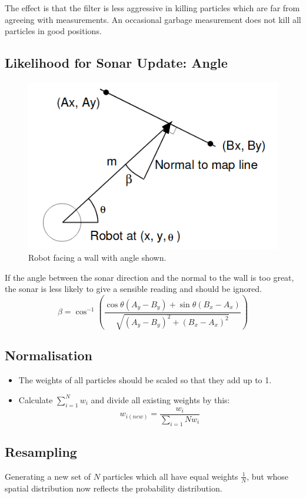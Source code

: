 \documentclass[11pt]{article}
\begin{document}
The effect is that the filter is less aggressive in killing particles which are far from agreeing with measurements.
An occasional garbage measurement does not kill all particles in good positions.

\subsection{Likelihood for Sonar Update: Angle}
\begin{figure}[h]
  \caption{Robot facing a wall with angle shown.}
  \includegraphics[scale=0.4]{sonarangle}
  \centering
\end{figure}

If the angle between the sonar direction and the normal to the wall is too great, the sonar is less likely to give a sensible reading and should be ignored.
\[
  \beta = \cos^{-1} \left( \frac{\cos \theta (A_y - B_y) + \sin \theta (B_x - A_x)}{\sqrt{(A_y - B_y)^2 + (B_x - A_x)^2}} \right)
\]

\subsection{Normalisation}
\begin{itemize}
  \item The weights of all particles should be scaled so that they add up to 1.
  \item Calculate $\sum_{i = 1}^N w_i$ and divide all existing weights by this:
    \[
      w_{i(new)} = \frac{w_i}{\sum_{i = 1}{N} w_i}
    \]
\end{itemize}

\subsection{Resampling}
Generating a new set of $N$ particles which all have equal weights $\frac{1}{N}$, but whose spatial distribution now reflects the probability distribution.
\end{document}
